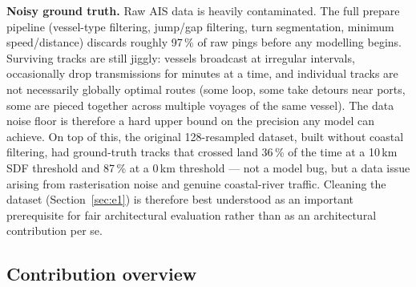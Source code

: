 \documentclass[11pt,a4paper]{article}
\begin{document}
\textbf{Noisy ground truth.}
Raw AIS data is heavily contaminated.
The full prepare pipeline (vessel-type filtering, jump/gap filtering, turn
segmentation, minimum speed/distance) discards roughly 97\,\% of raw pings
before any modelling begins.
Surviving tracks are still jiggly: vessels broadcast at irregular intervals,
occasionally drop transmissions for minutes at a time, and individual tracks
are not necessarily globally optimal routes (some loop, some take detours
near ports, some are pieced together across multiple voyages of the same
vessel).
The data noise floor is therefore a hard upper bound on the precision any
model can achieve.
On top of this, the original 128-resampled dataset, built without coastal
filtering, had ground-truth tracks that crossed land 36\,\% of the time at a
10\,km SDF threshold and 87\,\% at a 0\,km threshold --- not a model bug,
but a data issue arising from rasterisation noise and genuine coastal-river
traffic. Cleaning the dataset (Section~\ref{sec:e1}) is therefore best
understood as an important prerequisite for fair architectural evaluation
rather than as an architectural contribution per se.

\subsection{Contribution overview}
\label{sec:contribution-overview}
\end{document}
